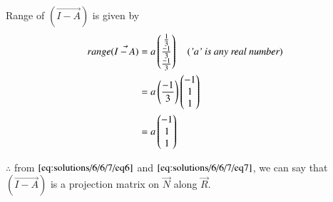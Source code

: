 	Range of $(\vec{I-A})$ is given by
	\begin{align}\label{eq:solutions/6/6/7/eq7}
		range(\Vec{I-A}) &= a \begin{pmatrix}\frac{1}{3}\\\frac{-1}{3}\\\frac{-1}{3}\end{pmatrix} \quad ( \textit{'a' is any real number}) \nonumber \\
		&= a \left(\frac{-1}{3}\right) \begin{pmatrix}-1\\1\\1\end{pmatrix} \nonumber\\
		&= a \begin{pmatrix}-1\\1\\1\end{pmatrix}
	\end{align}
	
	$\therefore$ from $\eqref{eq:solutions/6/6/7/eq6}$ and $\eqref{eq:solutions/6/6/7/eq7}$, we can say that $(\Vec{I-A})$ is a projection matrix on $\vec{N}$ along $\vec{R}$.
	

